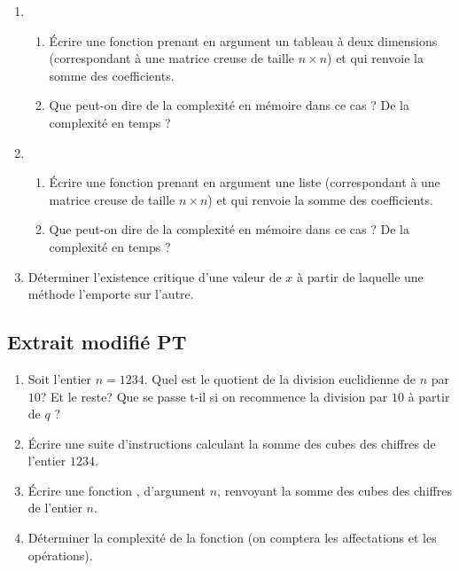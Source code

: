 \documentclass[french,11pt,twoside]{VcCours}
\begin{document}
\begin{enumerate}
\item
\begin{enumerate}
\item Écrire une fonction  prenant en argument un tableau à deux dimensions (correspondant à une matrice creuse de taille $n \times n$) et qui renvoie la somme des coefficients.
\item Que peut-on dire de la complexité en mémoire dans ce cas ? De la complexité en temps ?
\end{enumerate}
\item \begin{enumerate}
\item Écrire une fonction  prenant en argument une liste (correspondant à une matrice creuse de taille $n \times n$) et qui renvoie la somme des coefficients.
\item Que peut-on dire de la complexité en mémoire dans ce cas ? De la complexité en temps ?
\end{enumerate}
\item Déterminer l'existence critique d'une valeur de $x$ à partir de laquelle une méthode l'emporte sur l'autre.
\end{enumerate}

\subsection{Extrait modifié PT}

\begin{enumerate}
\item Soit l'entier $n=1234$. Quel est le quotient de la division euclidienne de $n$ par $10$? Et le reste? Que se passe t-il si on recommence la division par $10$ à partir de $q$ ?
\item Écrire une suite d'instructions calculant la somme des cubes des chiffres de l'entier $1234$.
\item Écrire une fonction , d'argument $n$, renvoyant la somme des cubes des chiffres de l'entier $n$.
\item Déterminer la complexité de la fonction  (on comptera les affectations et les opérations).
\end{enumerate}
\end{document}
